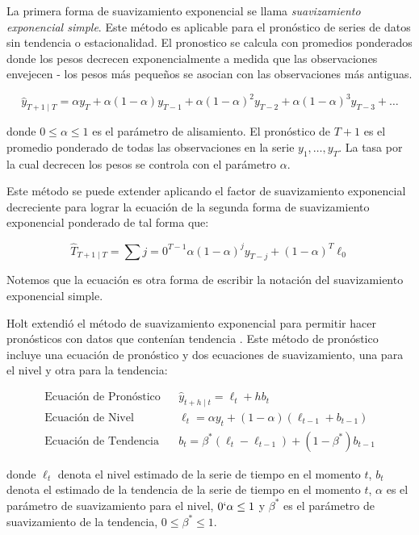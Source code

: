 La primera forma de suavizamiento exponencial se llama \emph{suavizamiento exponencial simple}. Este método es aplicable para el pronóstico de series de datos sin tendencia o estacionalidad. El pronostico se calcula con promedios ponderados donde los pesos decrecen exponencialmente a medida que las observaciones envejecen - los pesos más pequeños se asocian con las observaciones más antiguas.

\[ \hat{y}_{T+1 \mid T} = \alpha y_{T} + \alpha(1-\alpha) y_{T-1} + \alpha(1-\alpha)^2 y_{T-2} + \alpha(1-\alpha)^3 y_{T-3} + \ldots \]

donde $0 \leq \alpha \leq 1$ es el parámetro de alisamiento. El pronóstico de $T + 1$ es el promedio ponderado de todas las observaciones en la serie $y_1, \ldots, y_T$. La tasa por la cual decrecen los pesos se controla con el parámetro $\alpha$.

Este método se puede extender aplicando el factor de suavizamiento exponencial decreciente para lograr la ecuación de la segunda forma de suavizamiento exponencial ponderado de tal forma que:

\[ \hat{T}_{T+1 \mid T} = \sum{j=0}^{T-1} \alpha(1-\alpha)^j y_{T-j} + (1-\alpha)^{T} \ell_{0}  \]

Notemos que la ecuación es otra forma de escribir la notación del suavizamiento exponencial simple.

Holt extendió el método de suavizamiento exponencial para permitir hacer pronósticos con datos que contenían tendencia \cite{hyndman}. Este método de pronóstico incluye una ecuación de pronóstico y dos ecuaciones de suavizamiento, una para el nivel y otra para la tendencia:

\begin{eqnarray*}
	\text{Ecuación de Pronóstico}&&\hat{y}_{t+h \mid t} = \ell_{t} + hb_{t} \\
	\text{Ecuación de Nivel}&&\ell_{t} = \alpha y_{t} + (1 - \alpha)(\ell_{t-1} + b_{t-1}) \\
	\text{Ecuación de Tendencia}&&b_{t} = \beta^{*}(\ell_{t} - \ell_{t-1}) + (1 - \beta^{*})b_{t-1}
\end{eqnarray*}

donde $\ell_{t}$ denota el nivel estimado de la serie de tiempo en el momento $t$, $b_{t}$ denota el estimado de la tendencia de la serie de tiempo en el momento $t$, $\alpha$ es el parámetro de suavizamiento para el nivel, $0 \lq \alpha \leq 1$ y $\beta^{*}$ es el parámetro de suavizamiento de la tendencia, $0 \leq \beta^{*} \leq 1$.

